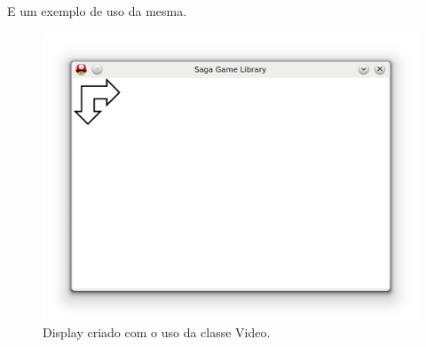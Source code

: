 %
%
E um exemplo de uso da mesma.
%
%

%
%
\begin{figure}[H]
    \centering
		\caption{Display criado com o uso da classe Video.}
    \label{display}
    \includegraphics[scale = 0.40]{Imagens/display.png}
\end{figure}
%
%
